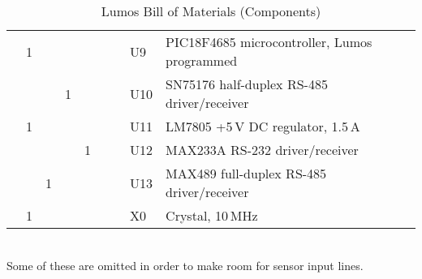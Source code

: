 \documentclass[letterpaper,twoside,onecolumn,openright,final]{memoir}
\begin{document}
\begin{table}
\begin{tabular}[c]{r|r|r|r|r|r|r|ll}
  & 1&  &  &  &  &  & U9     & PIC18F4685 microcontroller, Lumos programmed \\
  &  &  & 1&  &  &  & U10    & SN75176 half-duplex RS-485 driver/receiver\\
  & 1&  &  &  &  &  & U11    & LM7805 +5\,V DC regulator, 1.5\,A \\
  &  &  &  & 1&  &  & U12    & MAX233A RS-232 driver/receiver\\
  &  & 1&  &  &  &  & U13    & MAX489 full-duplex RS-485 driver/receiver\\
\midrule
  & 1&  &  &  &  &  & X0     & Crystal, 10\,MHz \\
\bottomrule
%
\end{tabular}
\\{\footnotesize *Some of these are omitted in order to make room for sensor input lines.}
\caption{Lumos Bill of Materials (Components)\label{tbl:bom}}
\end{table}
\end{document}
